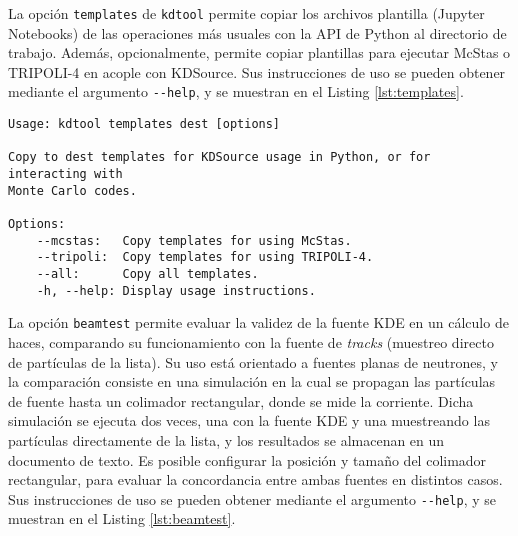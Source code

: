 La opción \verb|templates| de \verb|kdtool| permite copiar los archivos plantilla (Jupyter Notebooks) de las operaciones más usuales con la API de Python al directorio de trabajo. Además, opcionalmente, permite copiar plantillas para ejecutar McStas o TRIPOLI-4 en acople con KDSource. Sus instrucciones de uso se pueden obtener mediante el argumento \verb|--help|, y se muestran en el Listing \ref{lst:templates}.

\begin{lstlisting}[label={lst:templates}, caption=Instrucciones de uso del comando \texttt{kdtool templates} (output de ``\texttt{kdtool templates --help}'').]
Usage: kdtool templates dest [options]

Copy to dest templates for KDSource usage in Python, or for interacting with
Monte Carlo codes.

Options:
	--mcstas:   Copy templates for using McStas.
	--tripoli:  Copy templates for using TRIPOLI-4.
	--all:      Copy all templates.
	-h, --help: Display usage instructions.
\end{lstlisting}

La opción \verb|beamtest| permite evaluar la validez de la fuente KDE en un cálculo de haces, comparando su funcionamiento con la fuente de \emph{tracks} (muestreo directo de partículas de la lista). Su uso está orientado a fuentes planas de neutrones, y la comparación consiste en una simulación en la cual se propagan las partículas de fuente hasta un colimador rectangular, donde se mide la corriente. Dicha simulación se ejecuta dos veces, una con la fuente KDE y una muestreando las partículas directamente de la lista, y los resultados se almacenan en un documento de texto. Es posible configurar la posición y tamaño del colimador rectangular, para evaluar la concordancia entre ambas fuentes en distintos casos. Sus instrucciones de uso se pueden obtener mediante el argumento \verb|--help|, y se muestran en el Listing \ref{lst:beamtest}.

